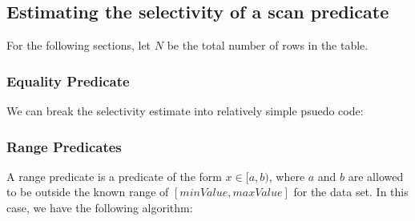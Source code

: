 \documentclass[10pt]{amsart}
\begin{document}
\subsection{Estimating the selectivity of a scan predicate}
For the following sections, let $N$ be the total number of rows in the table.
\subsubsection{Equality Predicate}
We can break the selectivity estimate into relatively simple psuedo code:
\begin{algorithm}[ht]
				\caption{Computing the selectivity of an Equals predicate}
\end{algorithm}

\subsubsection{Range Predicates}
A range predicate is a predicate of the form $x \in [a,b)$, where $a$ and $b$ are allowed to be outside the known range of $[minValue,maxValue]$ for the data set. In this case, we have the following algorithm:
\end{document}
